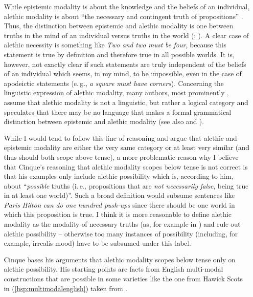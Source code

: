 \noindent While epistemic modality is about the knowledge and the beliefs of an individual, alethic modality is about ``the necessary and contingent truth of propositions'' \citep[8--9]{nuyts2006modality}. Thus, the distinction between epistemic and alethic modality is one between truths in the mind of an individual versus truths in the world (\citealt[11]{palmer1986mood}; \citealt[9]{nuyts2006modality}). A clear case of alethic necessity is something like \textit{Two and two must be four}, because this statement is true by definition and therefore true in all possible worlds. It is, however, not exactly clear if such statements are truly independent of the beliefs of an individual which seems, in my mind, to be impossible, even in the case of apodeictic statements (e.\,g., \textit{a square must have corners}). Concerning the linguistic expression of alethic modality, many authors, most prominently \citet[11]{palmer1986mood}, assume that alethic modality is not a linguistic, but rather a logical category and speculates that there may be no language that makes a formal grammatical distinction between epistemic and alethic modality (see also \citealt[28]{nuyts2000epistemic} and \citealt{von2006modality}).

While I would tend to follow this line of reasoning and argue that alethic and epistemic modality are either the very same category or at least very similar (and thus should both scope above tense), a more problematic reason why I believe that Cinque's reasoning that alethic modality scopes below tense is not correct is that his examples only include alethic possibility which is, according to him, about ``\textit{possible} truths (i.\,e., propositions that are \textit{not necessarily false}, being true in at least one world)''. Such a broad definition would subsume sentences like \textit{Paris Hilton can do one hundred push-ups} since there should be one world in which this proposition is true. I think it is more reasonable to define alethic modality as the modality of necessary truths (as, for example in \citealt{nuyts2000epistemic}) and rule out alethic possibility -- otherwise too many instances of possibility (including, for example, irrealis mood) have to be subsumed under this label. 

Cinque bases his arguments that alethic modality scopes below tense only on alethic possibility. His starting points are facts from English multi-modal constructions that are possible in some varieties like the one from Hawick Scots in (\ref{bsp:multimodalenglish}) taken from \citet[75]{brown1922double}. 

